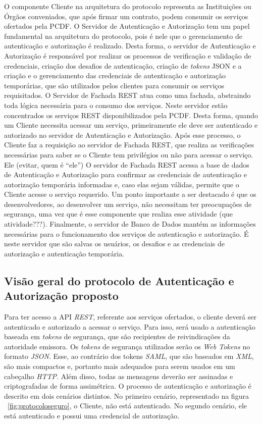O componente Cliente na arquitetura do protocolo representa as Instituições ou Órgãos conveniados, que após firmar um contrato, podem consumir os serviços ofertados pela PCDF.
O Servidor de Autenticação e Autorização tem um papel fundamental na arquitetura do protocolo, pois é nele que o gerenciamento de autenticação e autorização é realizado. Desta forma, o servidor de Autenticação e Autorização é responsável por realizar os processos de verificação e validação de credenciais, criação dos desafios de autenticação, criação de \emph{tokens} JSON e a criação e o gerenciamento das credenciais de autenticação e autorização temporárias, que são utilizados pelos clientes para consumir os serviços requisitados.
O Servidor de Fachada REST atua como uma fachada, abstraindo toda lógica necessária para o consumo dos serviços. Neste servidor estão concentrados os serviços REST disponibilizados pela PCDF. Desta forma, quando um Cliente necessita acessar um serviço, primeiramente ele deve ser autenticado e autorizado no servidor de Autenticação e Autorização. Após esse processo, o Cliente faz a requisição ao servidor de Fachada REST, que realiza as verificações necessárias para saber se o Cliente tem privilégios ou não para acessar o serviço. {\color{red}Ele (evitar, quem \'{e} ``ele'')} O servidor de Fachada REST acessa a base de dados de Autenticação e Autorização para confirmar as credenciais de autenticação e autorização temporária informadas e, caso elas sejam válidas, permite que o Cliente acesse o serviço requerido. Um ponto importante a ser destacado é que os desenvolvedores, ao desenvolver um serviço, não necessitam ter preocupações de segurança, uma vez que é esse componente que realiza {\color{red}esse atividade (que atividade???)}. Finalmente, o servidor de Banco de Dados mant\'{e}m as informa\c c\~{o}es necess\'{a}rias   para o funcionamento dos serviços de autenticação e autorização. É neste servidor que são salvas os usuários, os desafios e as credenciais de autorização e autenticação temporária.


\subsection{Visão geral do protocolo de Autenticação e Autorização proposto}

Para ter acesso a API \emph{REST}, referente aos serviços ofertados, o cliente deverá ser autenticado e autorizado a acessar o serviço. Para isso, será usado a autenticação baseada em \emph{tokens} de segurança, que são recipientes de reivindicações da autoridade emissora. Os \emph{tokens} de segurança utilizados serão os \emph{Web Tokens} no formato \emph{JSON}. Esse, ao contrário dos tokens \emph{SAML}, que são baseados em \emph{XML}, são mais compactos e, portanto mais adequados para serem usados em um cabeçalho \emph{HTTP}. Além disso, todas as mensagens deverão ser assinadas e criptografadas de forma assimétrica. O processo de autenticação e autorização é descrito em dois cenários distintos. No primeiro cenário, representado na figura ~\ref{fig:protocoloseguro}, o Cliente, não está autenticado. No segundo cenário, ele está autenticado e possui uma credencial de autorização. %

